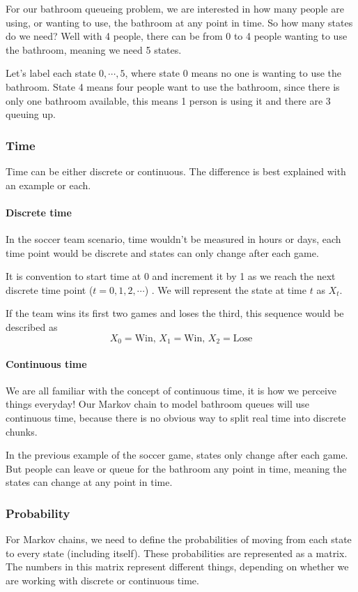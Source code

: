 For our bathroom queueing problem, we are interested in how many people are using, or wanting to use, the bathroom at any point in time. So how many states do we need? Well with 4 people, there can be from 0 to 4 people wanting to use the bathroom, meaning we need 5 states. 

Let's label each state $0, \cdots, 5$, where state 0 means no one is wanting to use the bathroom. State 4 means four people want to use the bathroom, since there is only one bathroom available, this means 1 person is using it and there are 3 queuing up.

\subsubsection*{Time}
Time can be either discrete or continuous. The difference is best explained with an example or each.

\paragraph{Discrete time}
In the soccer team scenario, time wouldn't be measured in hours or days, each time point would be discrete and states can only change after each game. 

It is convention to start time at 0 and increment it by 1 as we reach the next discrete time point ($t=0, 1, 2, \cdots$) . We will represent the state at time $t$ as $X_t$.

If the team wins its first two games and loses the third, this sequence would be described as
$$ X_0 = \text{Win}, \, X_1 = \text{Win},\, X_2 = \text{Lose}$$

\paragraph{Continuous time}
We are all familiar with the concept of continuous time, it is how we perceive things everyday! Our Markov chain to model bathroom queues will use continuous time, because there is no obvious way to split real time into discrete chunks. 

In the previous example of the soccer game, states only change after each game. But people can leave or queue for the bathroom any point in time, meaning the states can change at any point in time.

\subsubsection*{Probability}
For Markov chains, we need to define the probabilities of moving from each state to every state (including itself). These probabilities are represented as a matrix. The numbers in this matrix represent different things, depending on whether we are working with discrete or continuous time.

